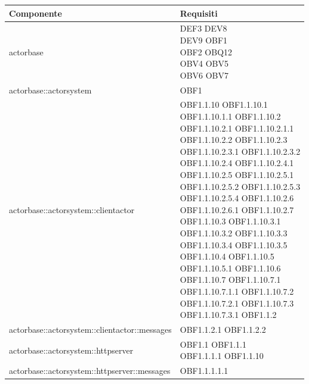 \documentclass{scalatekids-article}
\begin{document}
\begin{longtable}[H]{|p{9cm}|p{8cm}|}
  \hline
  \textbf{Componente} & \textbf{Requisiti}\\
  \hline
  actorbase & \multiLineCell[t]{DEF3 DEV8\\DEV9 OBF1\\OBF2 OBQ12\\OBV4 OBV5\\OBV6 OBV7\\}\\
\hline
actorbase::actorsystem & \multiLineCell[t]{OBF1\\}\\
\hline
actorbase::actorsystem::clientactor & \multiLineCell[t]{OBF1.1.10 OBF1.1.10.1\\OBF1.1.10.1.1 OBF1.1.10.2\\OBF1.1.10.2.1 OBF1.1.10.2.1.1\\OBF1.1.10.2.2 OBF1.1.10.2.3\\OBF1.1.10.2.3.1 OBF1.1.10.2.3.2\\OBF1.1.10.2.4 OBF1.1.10.2.4.1\\OBF1.1.10.2.5 OBF1.1.10.2.5.1\\OBF1.1.10.2.5.2 OBF1.1.10.2.5.3\\OBF1.1.10.2.5.4 OBF1.1.10.2.6\\OBF1.1.10.2.6.1 OBF1.1.10.2.7\\OBF1.1.10.3 OBF1.1.10.3.1\\OBF1.1.10.3.2 OBF1.1.10.3.3\\OBF1.1.10.3.4 OBF1.1.10.3.5\\OBF1.1.10.4 OBF1.1.10.5\\OBF1.1.10.5.1 OBF1.1.10.6\\OBF1.1.10.7 OBF1.1.10.7.1\\OBF1.1.10.7.1.1 OBF1.1.10.7.2\\OBF1.1.10.7.2.1 OBF1.1.10.7.3\\OBF1.1.10.7.3.1 OBF1.1.2\\}\\
\hline
actorbase::actorsystem::clientactor::messages & \multiLineCell[t]{OBF1.1.2.1 OBF1.1.2.2\\}\\
\hline
actorbase::actorsystem::httpserver & \multiLineCell[t]{OBF1.1 OBF1.1.1\\OBF1.1.1.1 OBF1.1.10\\}\\
\hline
actorbase::actorsystem::httpserver::messages & \multiLineCell[t]{OBF1.1.1.1.1\\}\\

\end{longtable}
\end{document}
